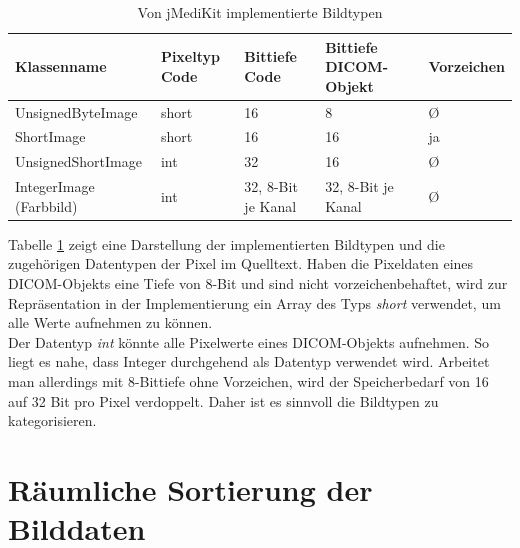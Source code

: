 \begin{table}
    \begin{tabularx}{\textwidth}{|p{5cm}|X|X|X|X|}
    \toprule
    \hline
    \textbf{Klassenname}         & \textbf{Pixeltyp Code}    & \textbf{Bittiefe Code}& \textbf{Bittiefe DICOM-Objekt} & \textbf{Vorzeichen} \\ \hline
    UnsignedByteImage 		 	& short					& 16 		  & 8 & \O \\ \hline
    ShortImage 		 			  & short				& 16 		  	  & 	16 & ja\\ \hline
    UnsignedShortImage						  & int		& 32 		  & 16 & \O \\ \hline
    IntegerImage (Farbbild)				      & int		& 32, 8-Bit je Kanal		  & 32, 8-Bit je Kanal & \O \\ \hline

    \bottomrule
    \end{tabularx}
    \caption {Von jMediKit implementierte Bildtypen}
    \label{java:bildtypen}
\end{table}

Tabelle \ref{java:bildtypen} zeigt eine Darstellung der implementierten Bildtypen und die zugehörigen Datentypen der Pixel im Quelltext. Haben die Pixeldaten eines DICOM-Objekts eine Tiefe von 8-Bit und sind nicht vorzeichenbehaftet, wird zur Repräsentation in der Implementierung ein Array des Typs \textit{short} verwendet, um alle Werte aufnehmen zu können.\\
Der Datentyp \textit{int} könnte alle Pixelwerte eines DICOM-Objekts aufnehmen. So liegt es nahe, dass Integer durchgehend als Datentyp verwendet wird. Arbeitet man allerdings mit 8-Bittiefe ohne Vorzeichen, wird der Speicherbedarf von 16 auf 32 Bit pro Pixel verdoppelt. Daher ist es sinnvoll die Bildtypen zu kategorisieren.

\FloatBarrier
\section{Räumliche Sortierung der Bilddaten}

